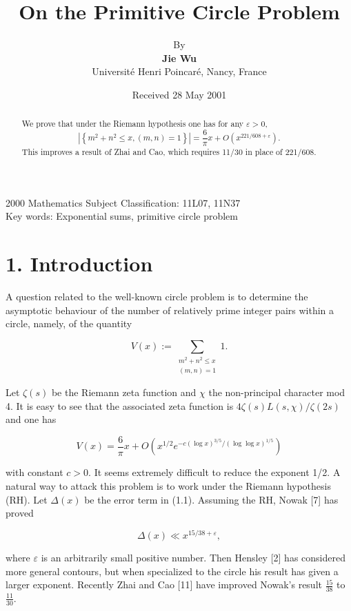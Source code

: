 \documentclass[10pt]{article}
\title{On the Primitive Circle Problem}
\author{By\\[0.5ex]\textbf{Jie Wu}\\
Université Henri Poincaré, Nancy, France}
\date{Received 28 May 2001}
\begin{document}
\maketitle

\begin{abstract}
We prove that under the Riemann hypothesis one has for any $\varepsilon>0$, $$ \left|\left\{m^{2}+n^{2} \leqslant x,(m, n)=1\right\}\right|=\frac{6}{\pi} x+O\left(x^{221 / 608+\varepsilon}\right) . $$ This improves a result of Zhai and Cao, which requires 11/30 in place of 221/608.
\end{abstract}

2000 Mathematics Subject Classification: 11L07, 11N37\\
Key words: Exponential sums, primitive circle problem

\section*{1. Introduction}
A question related to the well-known circle problem is to determine the asymptotic behaviour of the number of relatively prime integer pairs within a circle, namely, of the quantity

$$
V(x):=\sum_{\substack{m^{2}+n^{2} \leq x \\(m, n)=1}} 1 .
$$

Let $\zeta(s)$ be the Riemann zeta function and $\chi$ the non-principal character mod 4. It is easy to see that the associated zeta function is $4 \zeta(s) L(s, \chi) / \zeta(2 s)$ and one has


\begin{equation*}
V(x)=\frac{6}{\pi} x+O\left(x^{1 / 2} e^{-c(\log x)^{3 / 5} /(\log \log x)^{1 / 5}}\right) \tag{1.1}
\end{equation*}


with constant $c>0$. It seems extremely difficult to reduce the exponent 1/2. A natural way to attack this problem is to work under the Riemann hypothesis (RH). Let $\Delta(x)$ be the error term in (1.1). Assuming the RH, Nowak [7] has proved


\begin{equation*}
\Delta(x) \ll x^{15 / 38+\varepsilon}, \tag{1.2}
\end{equation*}


where $\varepsilon$ is an arbitrarily small positive number. Then Hensley [2] has considered more general contours, but when specialized to the circle his result has given a larger exponent. Recently Zhai and Cao [11] have improved Nowak's result $\frac{15}{38}$ to $\frac{11}{30}$.
\end{document}
